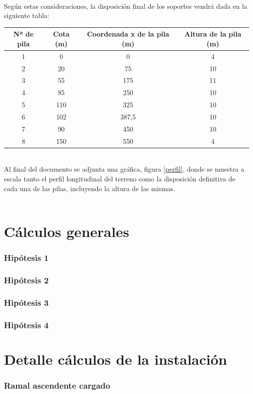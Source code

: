 \documentclass[a4paper,11pt]{article}
\begin{document}
\\
Según estas consideraciones, la disposición final de los soportes vendrá dada en la siguiente tabla:\\
\begin{table}[htbp] \centering
\begin{tabular}{|c|c|c|c|}
\hline
Nª de pila & Cota (m) & Coordenada x de la pila (m) & Altura de la pila (m)\\
\hline
1 & 0 & 0 & 4\\
\hline
2 & 20 & 75 & 10\\
\hline
3 & 55 & 175 & 11\\
\hline
4 & 85 & 250 & 10\\
\hline
5 & 110 & 325 & 10\\
\hline
6 & 102 & 387,5 & 10\\
\hline
7 & 90 & 450 & 10\\
\hline
8 & 150 & 550 & 4\\
\hline
\end{tabular}
\end{table}
\\
Al final del documento se adjunta una gráfica, figura \ref{perfil}, donde se muestra a escala tanto el perfil longitudinal del terreno como la disposición definitiva de cada una de las pilas, incluyendo la altura de las mismas.\\
\\
\part{Cálculos generales}
\section{Hipótesis 1}
\section{Hipótesis 2}
\section{Hipótesis 3}
\section{Hipótesis 4}
\part{Detalle cálculos de la instalación}
\section{Ramal ascendente cargado}
\end{document}
